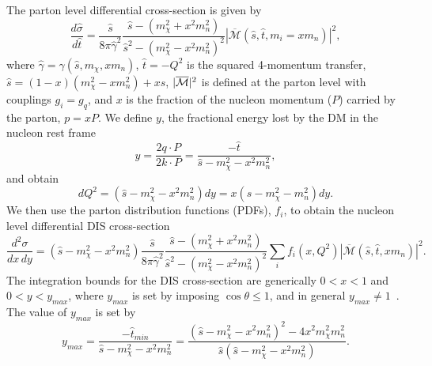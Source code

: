 The parton level differential cross-section is given by
\begin{equation}
    \frac{d\hat{\sigma}}{d\hat{t}} = \frac{\hat{s}}{8\pi\hat{\gamma}^2}\frac{\hat{s}-(m_\chi^2+x^2m_n^2)}{\hat{s}^2-(m_\chi^2-x^2m_n^2)^2}|\overline{\mathcal{M}}(\hat{s},\hat{t},m_i=x m_n)|^2,
\end{equation}
where $\hat{\gamma} = \gamma(\hat{s}, m_\chi, xm_n)$, $\hat{t}=-Q^2$ is the squared 4-momentum transfer,  $\hat{s} = (1-x)(m_\chi^2-x m_n^2) +xs$, $|\overline{\mathcal M}|^2$ is defined at the parton level with couplings $g_i=g_q$, and $x$ is the fraction of the nucleon momentum ($P$) carried by the parton, $p=xP$. We define $y$, the fractional energy lost by the DM in the nucleon rest frame~\cite{Agashe:2014yua_Directdetectionboosted}
\begin{equation}
    y = \frac{2q\cdot P}{2k\cdot P} = \frac{-\hat{t}}{\hat{s}-m_\chi^2-x^2m_n^2}, 
\end{equation}
and obtain
\begin{equation}
    dQ^2 = (\hat{s}-m_\chi^2 - x^2m_n^2)dy = x(s - m_\chi^2 - m_n^2)dy. 
\end{equation}
We then use the parton distribution functions (PDFs), $f_i$, to obtain the nucleon level differential DIS cross-section
\small
\begin{equation}
    \frac{d^2\sigma}{dx\, dy} =(\hat{s} - m_\chi^2-x^2m_n^2) \frac{\hat{s}}{8\pi\hat{\gamma}^2}\frac{\hat{s}-(m_\chi^2+x^2m_n^2)}{\hat{s}^2-(m_\chi^2-x^2m_n^2)^2}\sum_i f_i(x, Q^2)|\overline{\mathcal{M}}(\hat{s},\hat{t},x m_n)|^2.
\end{equation}
\normalsize
The integration bounds for the DIS cross-section are generically $0<x<1$ and $0<y<y_{max}$, where $y_{max}$ is set by imposing $\cos\theta\leq 1$, and in general $y_{max}\neq 1$~\cite{Agashe:2014yua_Directdetectionboosted}.  The value of $y_{max}$ is set by
\begin{equation}
    y_{max} = \frac{-\hat{t}_{min}}{\hat{s} - m_\chi^2 - x^2 m_n^2}
     = \frac{(\hat{s} -m_\chi^2 -x^2m_n^2)^2 - 4 x^2 m_\chi^2 m_n^2}{\hat{s}(\hat{s} -m_\chi^2 - x^2m_n^2)}. 
\end{equation}

